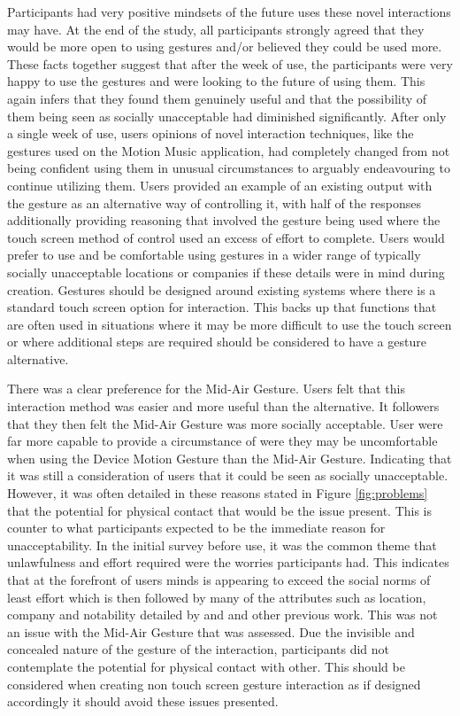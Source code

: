 \documentclass{l4proj}
\begin{document}
Participants had very positive mindsets of the future uses these novel interactions may have. At the end of the study, all participants strongly agreed that they would be more open to using gestures and/or believed they could be used more. These facts together suggest that after the week of use, the participants were very happy to use the gestures and were looking to the future of using them. This again infers that they found them genuinely useful and that the possibility of them being seen as socially unacceptable had diminished significantly. After only a single week of use, users opinions of novel interaction techniques, like the gestures used on the Motion Music application, had completely changed from not being confident using them in unusual circumstances to arguably endeavouring to continue utilizing them. Users provided an example of an existing output with the gesture as an alternative way of controlling it, with half of the responses additionally providing reasoning that involved the gesture being used where the touch screen method of control used an excess of effort to complete. Users would prefer to use and be comfortable using gestures in a wider range of typically socially unacceptable locations or companies if these details were in mind during creation. Gestures should be designed around existing systems where there is a standard touch screen option for interaction. This backs up that functions that are often used in situations where it may be more difficult to use the touch screen or where additional steps are required should be considered to have a gesture alternative. 

There was a clear preference for the Mid-Air Gesture. Users felt that this interaction method was easier and more useful than the alternative. It followers that they then felt the Mid-Air Gesture was more socially acceptable. User were far more capable to provide a circumstance of were they may be uncomfortable when using the Device Motion Gesture than the Mid-Air Gesture. Indicating that it was still a consideration of users that it could be seen as socially unacceptable. However, it was often detailed in these reasons stated in Figure \ref{fig:problems} that the potential for physical contact that would be the issue present. This is counter to what participants expected to be the immediate reason for unacceptability. In the initial survey before use, it was the common theme that unlawfulness and effort required were the worries participants had. This indicates that at the forefront of users minds is appearing to exceed the social norms of least effort which is then followed by many of the attributes such as location, company and notability detailed by \citet{rico_usable_2010} and \citet{pohl_focused_2013} and other previous work. This was not an issue with the Mid-Air Gesture that was assessed. Due the invisible and concealed nature of the gesture of the interaction, participants did not contemplate the potential for physical contact with other. This should be considered when creating non touch screen gesture interaction as if designed accordingly it should avoid these issues presented.
\end{document}
